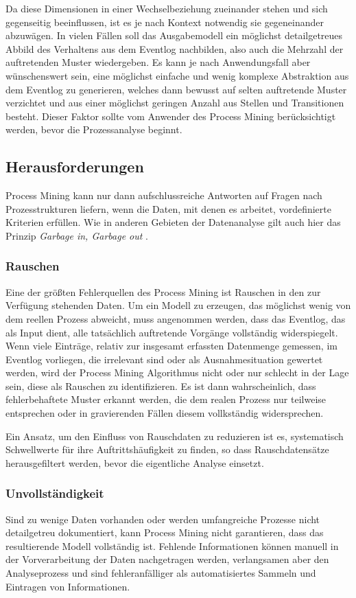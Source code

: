 Da diese Dimensionen in einer Wechselbeziehung zueinander stehen und sich gegenseitig beeinflussen, ist es je nach Kontext notwendig sie gegeneinander abzuwägen. In vielen Fällen soll das Ausgabemodell ein möglichst detailgetreues Abbild des Verhaltens aus dem Eventlog nachbilden, also auch die Mehrzahl der auftretenden Muster wiedergeben. 
Es kann je nach Anwendungsfall aber wünschenswert sein, eine möglichst einfache und wenig komplexe Abstraktion aus dem Eventlog zu generieren, welches dann bewusst auf selten auftretende Muster verzichtet und aus einer möglichst geringen Anzahl aus Stellen und Transitionen besteht. Dieser Faktor sollte vom Anwender des Process Mining berücksichtigt werden, bevor die Prozessanalyse beginnt.

\subsection{Herausforderungen}\label{challanges}
Process Mining kann nur dann aufschlussreiche Antworten auf Fragen nach Prozesstrukturen liefern, wenn die Daten, mit denen es arbeitet, vordefinierte Kriterien erfüllen. Wie in anderen Gebieten der Datenanalyse gilt auch hier das Prinzip \textit{Garbage in, Garbage out} \cite{GIGO}. 

\subsubsection{Rauschen}
Eine der größten Fehlerquellen des Process Mining ist Rauschen in den zur Verfügung stehenden Daten. Um ein Modell zu erzeugen, das möglichst wenig von dem reellen Prozess abweicht, muss angenommen werden, dass das Eventlog, das als Input dient, alle tatsächlich auftretende Vorgänge vollständig widerspiegelt. Wenn viele Einträge, relativ zur insgesamt erfassten Datenmenge gemessen, im Eventlog vorliegen, die irrelevant sind oder als Ausnahmesituation gewertet werden, wird der Process Mining Algorithmus nicht oder nur schlecht in der Lage sein, diese als Rauschen zu identifizieren. Es ist dann wahrscheinlich, dass fehlerbehaftete Muster erkannt werden, die dem realen Prozess nur teilweise entsprechen oder in gravierenden Fällen diesem vollkständig widersprechen.

Ein Ansatz, um den Einfluss von Rauschdaten zu reduzieren ist es, systematisch Schwellwerte für ihre Auftrittshäufigkeit zu finden, so dass Rauschdatensätze herausgefiltert werden, bevor die eigentliche Analyse einsetzt. 

\subsubsection{Unvollständigkeit}
Sind zu wenige Daten vorhanden oder werden umfangreiche Prozesse nicht detailgetreu dokumentiert, kann Process Mining nicht garantieren, dass das resultierende Modell vollständig ist. 
Fehlende Informationen können manuell in der Vorverarbeitung der Daten nachgetragen werden, verlangsamen aber den Analyseprozess und sind fehleranfälliger als automatisiertes Sammeln und Eintragen von Informationen. 

